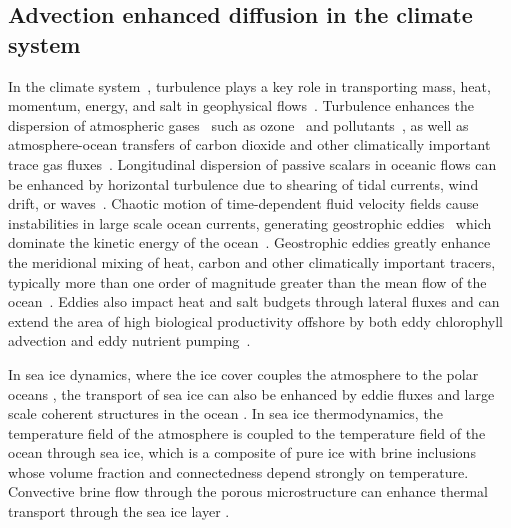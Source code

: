 \documentclass[amsa]{ipart}
\begin{document}
\subsection{Advection enhanced diffusion in the climate system}
\label{sec:AD_in_the_climate}
%
In the climate
system~\cite{Csanady:1973:9789027702609,Griffies:2003:10.1007},
turbulence plays a key role in transporting mass, heat, momentum,
energy, and salt in geophysical
flows~\cite{Moffatt:RPP:621}. Turbulence enhances the dispersion of
atmospheric gases~\cite{Espinosa:MET1292} such as
ozone~\cite{Holton:JGRC2495,Pitari:JGR:1986,Plumb:JAS:1979,Plumb:JAS:1987}
and
pollutants~\cite{Bilger:10.1175,Beychok:1994:9780964458802,Samson:1988:88009978},
as well as atmosphere-ocean transfers of carbon dioxide and other
climatically important trace gas
fluxes~\cite{Zappa:2007:67613,Banerjee:10.1007}.  Longitudinal
dispersion of passive scalars in oceanic flows can be enhanced by
horizontal turbulence due to shearing of tidal currents, wind drift,
or
waves~\cite{Young:JPO:1982:515,Kullenberg:1972:TUS1529,Bowden:JFM:1965}.   
Chaotic motion of 
time-dependent fluid velocity fields cause instabilities in large
scale ocean currents, generating geostrophic
eddies~\cite{Ferrari:JPO:1501} which dominate the kinetic energy of
the ocean~\cite{Ferrari:ARFM:253}. Geostrophic
eddies greatly enhance~\cite{Ferrari:JPO:1501} the meridional mixing
of heat, carbon and other climatically important tracers, typically
more than one order of magnitude greater than the mean flow of the
ocean~\cite{Souza:OS:317}. Eddies also impact heat and salt budgets
through lateral fluxes and can extend the area of high biological
productivity offshore by both eddy chlorophyll advection and eddy
nutrient pumping~\cite{Chaigneau:JGR:C11025}. 

In sea ice dynamics,
where the ice cover couples the atmosphere to the polar
oceans \cite{Washington:1986:9780935702521}, the transport of sea 
ice can also be enhanced by eddie
fluxes and large scale coherent structures in the ocean
\cite{Watanabe:2009JPO4010,Lukovich:AG:2015}. 
In sea ice thermodynamics, the temperature field of the 
atmosphere is coupled to the temperature field of the ocean through
sea ice, which is a composite of pure ice with brine inclusions
whose volume fraction and connectedness depend strongly
on temperature.
Convective brine flow through the porous
microstructure can enhance thermal transport through the sea ice layer
\cite{Lytle:JGR-8853,Worster:PTRSA:2015,Liu:2015}.
\end{document}
